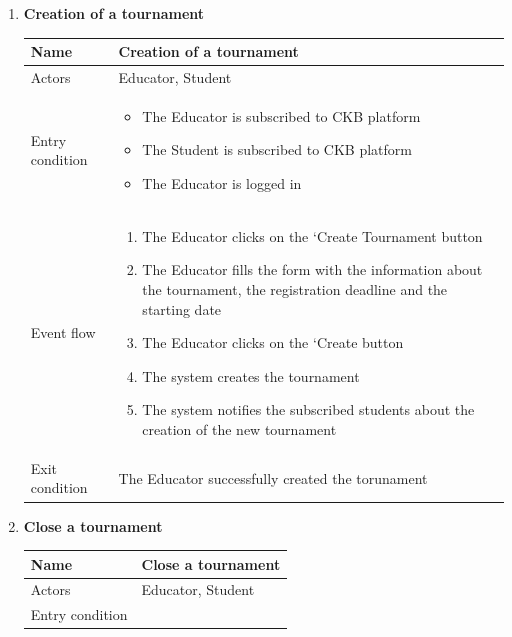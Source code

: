 \begin{enumerate}[label=UC\arabic*:]
\begin{tabular}{|p{3cm}|p{8cm}|}
\begin{itemize}
        \end{itemize}
        \\
        \hline
    \end{tabular}
    \item \textbf{Creation of a tournament} \\
    \begin{tabular}{|p{3cm}|p{8cm}|}
        \hline
        Name & Creation of a tournament \\
        \hline
        Actors & Educator, Student \\
        \hline
        Entry condition &
        \begin{itemize}
            \item The Educator is subscribed to CKB platform
            \item The Student is subscribed to CKB platform
            \item The Educator is logged in
        \end{itemize}
        \\
        \hline
        Event flow & 
        \begin{enumerate}[label=\arabic*.]
            \item The Educator clicks on the `Create Tournament button
            \item The Educator fills the form with the information about the tournament, the registration deadline and the starting date
            \item The Educator clicks on the `Create button
            \item The system creates the tournament
            \item The system notifies the subscribed students about the creation of the new tournament
        \end{enumerate}
        \\
        \hline
        Exit condition & The Educator successfully created the torunament \\
        \hline
    \end{tabular}
    \item \textbf{Close a tournament} \\
    \begin{tabular}{|p{3cm}|p{8cm}|}
    \hline
    Name & Close a tournament \\
    \hline
    Actors & Educator, Student \\
    \hline
    Entry condition &
    \begin{itemize}

\end{itemize}
\end{tabular}
\end{enumerate}
